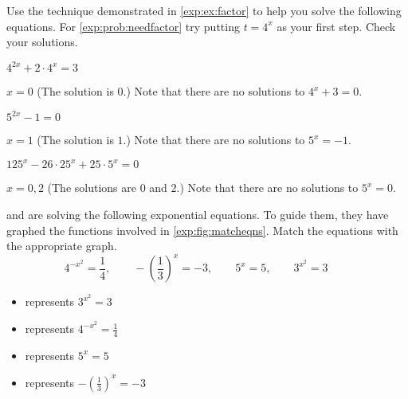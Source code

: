 \begin{exercises}
\begin{problem}[Factoring]
Use the technique demonstrated in \cref{exp:ex:factor} to help you solve the following 
equations.
For \cref{exp:prob:needfactor} try putting $t=4^x$ as your first step. Check your solutions.
\begin{multicols}{3}
	\begin{subproblem}\label{exp:prob:needfactor}
		$4^{2x}+2\cdot 4^x=3$
		\begin{shortsolution}
			$x=0$ (The solution is $0$.) Note that there are no solutions to $4^x+3=0$.
		\end{shortsolution}
	\end{subproblem}
	\begin{subproblem}
		$5^{2x}-1=0$
		\begin{shortsolution}
			$x=1$ (The solution is $1$.) Note that there are no solutions to $5^x=-1$.
		\end{shortsolution}
	\end{subproblem}
	\begin{subproblem}
		$125^x-26\cdot 25^x+25\cdot 5^x=0$
		\begin{shortsolution}
			$x=0,2$ (The solutions are $0$ and $2$.) Note that there are no solutions to $5^x=0$.
		\end{shortsolution}
	\end{subproblem}
\end{multicols}
\end{problem}
\begin{problem}\label{exp:prob:matcheqns}%
 and  are solving the following exponential equations. To guide them, 
they have graphed the functions involved in \cref{exp:fig:matcheqns}. Match the equations
with the appropriate graph.
\[
	4^{-x^2}=\frac{1}{4}, \qquad 
	-\left( \frac{1}{3} \right)^{x}=-3, \qquad
	5^x=5, \qquad 
	3^{x^2}=3 \qquad 
\]
\begin{shortsolution}
	\begin{itemize}
		\item {} represents $3^{x^2}=3$
		\item {} represents $4^{-x^2}=\frac{1}{4}$
		\item {} represents $5^x=5$
		\item {} represents $-\left( \frac{1}{3} \right)^{x}=-3$

\end{itemize}
\end{shortsolution}
\end{problem}
\end{exercises}
